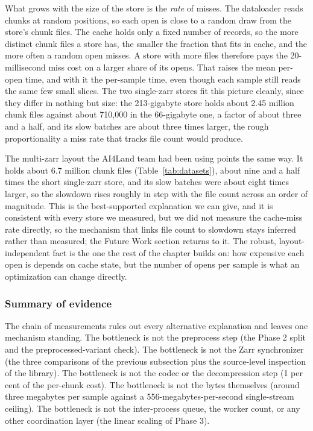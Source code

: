 \documentclass[12pt,a4paper]{article}
\begin{document}
What grows with the size of the store is the \emph{rate} of misses. The dataloader reads
chunks at random positions, so each open is close to a random draw from the store's chunk
files. The cache holds only a fixed number of records, so the more distinct chunk files a
store has, the smaller the fraction that fits in cache, and the more often a random open
misses. A store with more files therefore pays the 20-millisecond miss cost on a larger share
of its opens. That raises the mean per-open time, and with it the per-sample time, even though
each sample still reads the same few small slices. The two single-zarr stores fit this picture
cleanly, since they differ in nothing but size: the 213-gigabyte store holds about 2.45 million
chunk files against about 710{,}000 in the 66-gigabyte one, a factor of about three and a half,
and its slow batches are about three times larger, the rough proportionality a miss rate that
tracks file count would produce.

The multi-zarr layout the AI4Land team had been using points the same way. It holds about
6.7 million chunk files (Table~\ref{tab:datasets}), about nine and a half times the short
single-zarr store, and its slow batches were about eight times larger, so the slowdown rises
roughly in step with the file count across an order of magnitude. This is the best-supported
explanation we can give, and it is consistent with every store we measured, but we did not
measure the cache-miss rate directly, so the mechanism that links file count to slowdown stays
inferred rather than measured; the Future Work section returns to it. The robust, layout-independent
fact is the one the rest of the chapter builds on: how expensive each open is depends on cache
state, but the number of opens per sample is what an optimization can change directly.

\subsubsection{Summary of evidence}

The chain of measurements rules out every alternative explanation and leaves one mechanism
standing. The bottleneck is not the preprocess step (the Phase 2 split and the
preprocessed-variant check). The bottleneck is not the Zarr synchronizer (the three
comparisons of the previous subsection plus the source-level inspection of the library).
The bottleneck is not the codec or the decompression step (1 per cent of the per-chunk
cost). The bottleneck is not the bytes themselves (around three megabytes per sample
against a 556-megabytes-per-second single-stream ceiling). The bottleneck is not the
inter-process queue, the worker count, or any other coordination layer (the linear scaling
of Phase 3).
\end{document}
